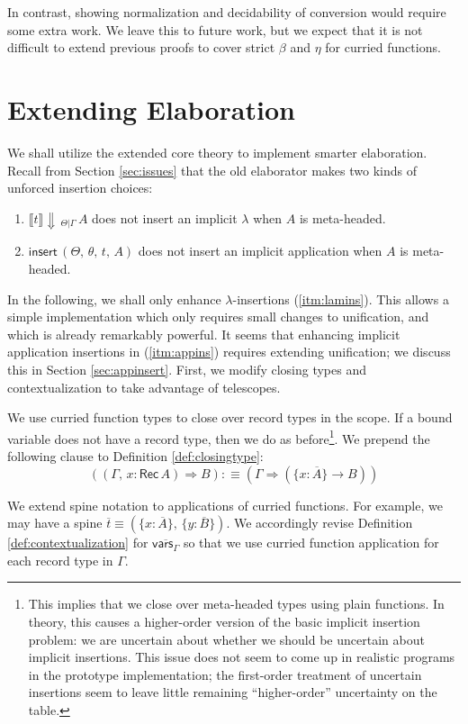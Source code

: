 \documentclass[acmsmall,screen,dvipsnames]{acmart}\settopmatter{}
\newcommand{\To}{\Rightarrow}
\newcommand{\echeck}[4]{\llbracket#1\rrbracket\!\Downarrow\,_{#2|#3}\,#4}
\newcommand{\einsert}{\mathsf{insert}}
\newcommand{\Rec}{\mathsf{Rec}}
\newcommand{\ol}[1]{\overline{#1}}
\theoremstyle{remark}
\begin{document}
In contrast, showing normalization and decidability of conversion would require
some extra work. We leave this to future work, but we expect that it is not
difficult to extend previous proofs to cover strict $\beta$ and $\eta$ for
curried functions.

\section{Extending Elaboration}
\label{sec:extending_elaboration}

We shall utilize the extended core theory to implement smarter
elaboration. Recall from Section \ref{sec:issues} that the old elaborator makes
two kinds of unforced insertion choices:
\begin{enumerate}
\item\label{itm:lamins} $\echeck{t}{\Theta}{\Gamma}{A}$ does not insert an implicit $\lambda$ when $A$ is meta-headed.
\item\label{itm:appins} $\einsert\,(\Theta,\,\theta,\,t,\,A)$ does not insert an implicit application when $A$ is meta-headed.
\end{enumerate}
In the following, we shall only enhance $\lambda$-insertions
(\ref{itm:lamins}). This allows a simple implementation which only requires
small changes to unification, and which is already remarkably powerful. It
seems that enhancing implicit application insertions in (\ref{itm:appins})
requires extending unification; we discuss this in Section
\ref{sec:appinsert}. First, we modify closing types and contextualization to
take advantage of telescopes.

\begin{definition}
We use curried function types to close over record types in the scope. If a
bound variable does not have a record type, then we do as before\footnote{This
  implies that we close over meta-headed types using plain functions. In theory,
  this causes a higher-order version of the basic implicit insertion problem: we
  are uncertain about whether we should be uncertain about implicit
  insertions. This issue does not seem to come up in realistic programs in the prototype implementation; the first-order treatment of uncertain insertions seem to leave little remaining ``higher-order'' uncertainty on the table.}. We prepend the
following clause to Definition
\ref{def:closingtype}:
\[
  ((\Gamma,\, x : \Rec\,A) \To B) :\equiv (\Gamma \To (\{x : \ol{A}\} \to B))
\]
\end{definition}
\begin{definition}[Contextualization]
We extend spine notation to applications of curried functions. For example, we
may have a spine $\ol{t} \equiv (\{x : \ol{A}\},\,\{y : \ol{B}\})$. We
accordingly revise Definition \ref{def:contextualization} for
$\overline{\mathsf{vars}_{\Gamma}}$ so that we use curried function application
for each record type in $\Gamma$.
\end{definition}
\end{document}
